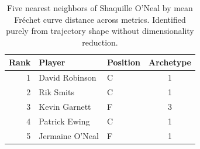 \begin{table}[htbp]
  \centering\small
  \begin{tabular}{rllc}
    \toprule
    Rank & Player & Position & Archetype \\
    \midrule
    1 & David Robinson & C & 1 \\
    2 & Rik Smits & C & 1 \\
    3 & Kevin Garnett & F & 3 \\
    4 & Patrick Ewing & C & 1 \\
    5 & Jermaine O'Neal & F & 1 \\
    \bottomrule
  \end{tabular}
  \caption{Five nearest neighbors of Shaquille O'Neal by mean Fr\'{e}chet curve distance across metrics. Identified purely from trajectory shape without dimensionality reduction.}
  \label{tab:Shaquille_O_Neal_frechet_curve_neighbors}
\end{table}

